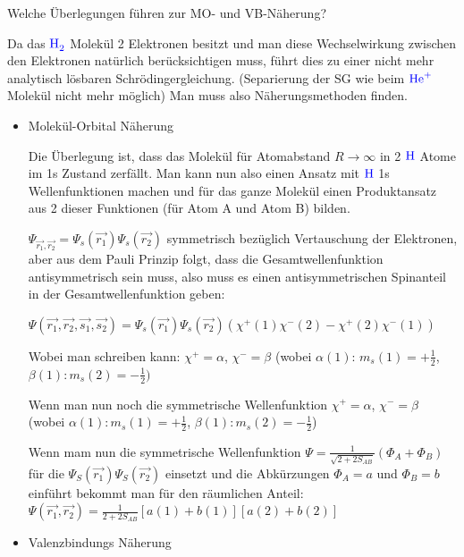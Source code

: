 \documentclass[a5paper,12pt,ngerman,print,grid=front]{kartei}
\let\oldce\ce
\renewcommand*{\ce}[1]{\begingroup\color{blue}\oldce{#1}\endgroup}
\begin{document}
	\begin{karte}{
		Welche Überlegungen führen zur MO- und VB-Näherung?
		}
			
		Da das $\ce{H2}$ Molekül 2 Elektronen besitzt und man diese Wechselwirkung zwischen 
		den Elektronen natürlich berücksichtigen muss, führt dies zu einer nicht mehr 
		analytisch lösbaren Schrödingergleichung. 
		(Separierung der SG wie beim $\ce{He^+}$ Molekül nicht mehr möglich)
		Man muss also Näherungsmethoden finden.
		
		\begin{itemize}
			\item Molekül-Orbital Näherung 
			
			Die Überlegung ist, dass das Molekül für Atomabstand $R \rightarrow \infty$ 
			in 2 $\ce{H}$ Atome im 1s Zustand zerfällt. 
			Man kann nun also einen Ansatz mit $\ce{H}$ 1s Wellenfunktionen machen und für 
			das ganze Molekül einen Produktansatz aus 2 dieser Funktionen 
			(für Atom A und Atom B) bilden.
			
			$\Psi_{\vec{r_1},\vec{r_2}} = \Psi_s(\vec{r_1})\Psi_s(\vec{r_2})$ symmetrisch bezüglich
			Vertauschung der Elektronen, aber aus dem Pauli Prinzip
			folgt, dass die Gesamtwellenfunktion antisymmetrisch sein muss, also muss es 
			einen antisymmetrischen Spinanteil in der Gesamtwellenfunktion geben:
			
			$\Psi(\vec{r_1},\vec{r_2},\vec{s_1},\vec{s_2})=
			\Psi_s(\vec{r_1})\Psi_s(\vec{r_2})(\chi^+(1)\chi^-(2) - \chi^+(2)\chi^-(1))$
			
			Wobei man schreiben kann: 
			$\chi^+ = \alpha$, $\chi^- = \beta$ 
			(wobei $\alpha(1)$: $m_s(1) = +\frac{1}{2}$, $\beta(1): m_s(2) = -\frac{1}{2})$
			
			Wenn man nun noch die symmetrische Wellenfunktion 
			$\chi^+ = \alpha$, $\chi^- = \beta$ 
			(wobei 
			$\alpha(1): m_s(1)= +\frac{1}{2}$, 
			$\beta(1):  m_s(2)= -\frac{1}{2}$)
			
			Wenn mam nun die symmetrische Wellenfunktion 
			$\Psi= \frac{1}{\sqrt{2+2S_{AB}}}(\Phi_A+\Phi_B)$
			für die $\Psi_S(\vec{r_1} ) \Psi_S(\vec{r_2} )$ einsetzt und die Abkürzungen $\Phi_A=a$ und 
			$\Phi_B=b$ einführt bekommt man für den räumlichen Anteil:
			$  \Psi( \vec{r_1}, \vec{r_2} ) = \frac{1}{2+2S_{AB}} \left[ a(1)+b(1) \right]\left[ a(2)+b(2) \right]   $
			
		\item Valenzbindungs Näherung 
		

\end{itemize}
\end{karte}
\end{document}
